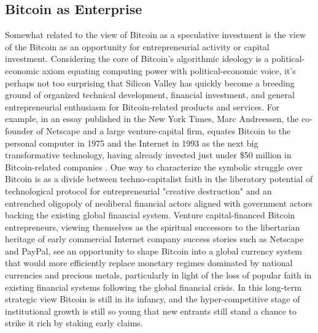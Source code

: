 \subsection*{Bitcoin as Enterprise}
Somewhat related to the view of Bitcoin as a speculative investment is the view of the Bitcoin as an opportunity for entrepreneurial activity or capital investment. Considering the core of Bitcoin's algorithmic ideology is a political-economic axiom equating computing power with political-economic voice, it's perhaps not too surprising that Silicon Valley has quickly become a breeding ground of organized technical development, financial investment, and general entrepreneurial enthusiasm for Bitcoin-related products and services. For example, in an essay published in the New York Times, Marc Andreessen, the co-founder of Netscape and a large venture-capital firm, equates Bitcoin to the personal computer in 1975 and the Internet in 1993 as the next big transformative technology, having already invested just under \$50 million in Bitcoin-related companies \autocite{Andreessen14}. One way to characterize the symbolic struggle over Bitcoin is as a divide between techno-capitalist faith in the liberatory potential of technological protocol for entrepreneurial "creative destruction" and an entrenched oligopoly of neoliberal financial actors aligned with government actors backing the existing global financial system. Venture capital-financed Bitcoin entrepreneurs, viewing themselves as the spiritual successors to the libertarian heritage of early commercial Internet company success stories such as Netscape and PayPal, see an opportunity to shape Bitcoin into a global currency system that would more efficiently replace monetary regimes dominated by national currencies and precious metals, particularly in light of the loss of popular faith in existing financial systems following the global financial crisis. In this long-term strategic view Bitcoin is still in its infancy, and the hyper-competitive stage of institutional growth is still so young that new entrants still stand a chance to strike it rich by staking early claims.

